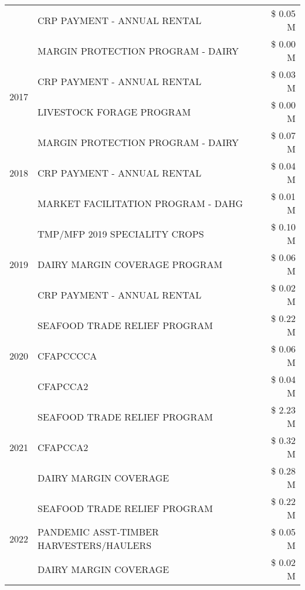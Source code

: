 \begin{tabular}{llr}
 & CRP PAYMENT - ANNUAL RENTAL & \$ 0.05 M \\
 & MARGIN PROTECTION PROGRAM - DAIRY & \$ 0.00 M \\
\cline{1-3}
\multirow[t]{2}{*}{2017} & CRP PAYMENT - ANNUAL RENTAL & \$ 0.03 M \\
 & LIVESTOCK FORAGE PROGRAM & \$ 0.00 M \\
\cline{1-3}
\multirow[t]{3}{*}{2018} & MARGIN PROTECTION PROGRAM - DAIRY & \$ 0.07 M \\
 & CRP PAYMENT - ANNUAL RENTAL & \$ 0.04 M \\
 & MARKET FACILITATION PROGRAM - DAHG & \$ 0.01 M \\
\cline{1-3}
\multirow[t]{3}{*}{2019} & TMP/MFP 2019 SPECIALITY CROPS & \$ 0.10 M \\
 & DAIRY MARGIN COVERAGE PROGRAM & \$ 0.06 M \\
 & CRP PAYMENT - ANNUAL RENTAL & \$ 0.02 M \\
\cline{1-3}
\multirow[t]{3}{*}{2020} & SEAFOOD TRADE RELIEF PROGRAM & \$ 0.22 M \\
 & CFAPCCCCA & \$ 0.06 M \\
 & CFAPCCA2 & \$ 0.04 M \\
\cline{1-3}
\multirow[t]{3}{*}{2021} & SEAFOOD TRADE RELIEF PROGRAM & \$ 2.23 M \\
 & CFAPCCA2 & \$ 0.32 M \\
 & DAIRY MARGIN COVERAGE & \$ 0.28 M \\
\cline{1-3}
\multirow[t]{3}{*}{2022} & SEAFOOD TRADE RELIEF PROGRAM & \$ 0.22 M \\
 & PANDEMIC ASST-TIMBER HARVESTERS/HAULERS & \$ 0.05 M \\
 & DAIRY MARGIN COVERAGE & \$ 0.02 M \\
\cline{1-3}
\bottomrule
\end{tabular}
